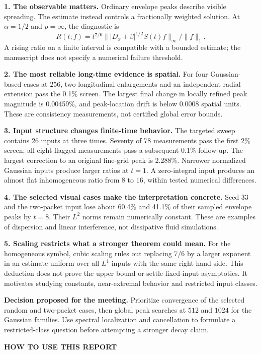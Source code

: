 \documentclass[10pt,letterpaper]{article}
\newcommand{\eyebrow}[1]{{\color{teal}\normalsize\bfseries #1}\par}
\newcommand{\callout}[1]{\par\smallskip\colorbox{pale}{\parbox{.96\linewidth}{\vspace{5pt}#1\vspace{5pt}}}\par\smallskip}
\begin{document}
\textbf{1. The observable matters.} Ordinary envelope peaks describe visible
spreading. The estimate instead controls a fractionally weighted solution. At
$\alpha=1/2$ and $p=\infty$, the diagnostic is
\[
 R(t;f)=t^{7/6}\big\||D_x+\beta|^{1/2}S(t)f\big\|_\infty/\|f\|_1.
\]
A rising ratio on a finite interval is compatible with a bounded estimate; the
manuscript does not specify a numerical failure threshold.

\textbf{2. The most reliable long-time evidence is spatial.} For four
Gaussian-based cases at $256$, two longitudinal enlargements and an independent
radial extension pass the 0.1\% screen. The largest final change in locally
refined peak magnitude is 0.00459\%, and peak-location drift is below 0.0008
spatial units. These are consistency measurements, not certified global error bounds.

\textbf{3. Input structure changes finite-time behavior.} The targeted sweep
contains 26 inputs at three times. Seventy of 78 measurements pass the first 2\%
screen; all eight flagged measurements pass a subsequent 0.1\% follow-up. The
largest correction to an original fine-grid peak is 2.288\%. Narrower normalized
Gaussian inputs produce larger ratios at $t=1$. A zero-integral input produces an
almost flat inhomogeneous ratio from $8$ to $16$, within tested numerical differences.

\textbf{4. The selected visual cases make the interpretation concrete.} Seed 33
and the two-packet input lose about 60.4\% and 41.1\% of their sampled envelope
peaks by $t=8$. Their $L^2$ norms remain numerically constant. These are examples
of dispersion and linear interference, not dissipative fluid simulations.

\textbf{5. Scaling restricts what a stronger theorem could mean.} For the
homogeneous symbol, cubic scaling rules out replacing $7/6$ by a larger exponent
in an estimate uniform over all $L^1$ inputs with the same right-hand side.
This deduction does not prove the upper bound or settle fixed-input asymptotics.
It motivates studying constants, near-extremal behavior and restricted input classes.
\callout{\textbf{Decision proposed for the meeting.} Prioritize convergence of
the selected random and two-packet cases, then global peak searches at $512$ and
$1024$ for the Gaussian families. Use spectral localization and cancellation to
formulate a restricted-class question before attempting a stronger decay claim.}
\newpage
{}\label{guide}
\eyebrow{HOW TO USE THIS REPORT}
\end{document}
